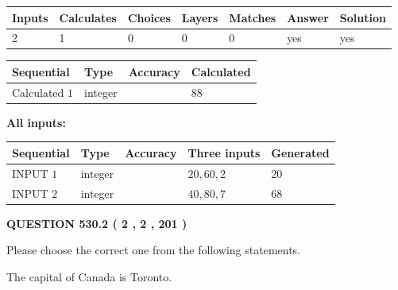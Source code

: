 \documentclass[12pt]{article}
\begin{document}
 

 
   
   
   
   
\noindent\begin{tabular}{|l|l|l|l|l|l|l|}
 \hline
Inputs & Calculates & Choices & Layers & Matches & Answer & Solution \\ \hline
 2  & 
 1  & 
 0
  & 
 0  & 
 0  & 
  yes & 
  yes 
  \\ \hline
 \end{tabular}
   
   
   
   
\noindent{}
   
   
  
  
\noindent\begin{tabular}{|l|l|l|l|}
\hline
 Sequential & Type & Accuracy & Calculated \\ 
\hline
 
 
  Calculated $  1 $ & integer &  & 
  $ 88 $ 
 \\  \hline  
 \end{tabular}
   
   
   
   
\noindent\vspace{0.1in}\hspace{-0.08in} {\textbf{\Large{All inputs: }}}
   
   
  
  
\noindent\begin{tabular}{|l|l|l|l|l|}
\hline
 Sequential & Type & Accuracy & Three inputs & Generated \\ 
\hline
 
 
  INPUT $  1 $ & integer &  & $
 20
 , 
 60
 , 
 2
 $ & $ 20 $ 
 \\  \hline  
 
 
  INPUT $  2 $ & integer &  & $
 40
 , 
 80
 , 
 7
 $ & $ 68 $ 
 \\  \hline  
 \end{tabular}
   
   
  
\vspace{0.2in}
  
{\textbf{\Large{QUESTION
530.2 
 ( 2 , 2 , 201 )
}}}
  
  
Please choose the correct one from the following statements.
 
 
The capital of Canada is Toronto.
 
\end{document}
